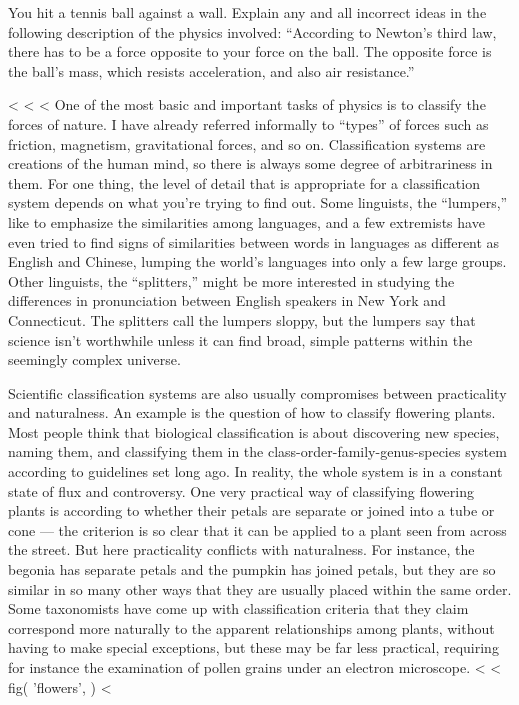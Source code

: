 \begin{dq}
You hit a tennis ball against a wall. Explain any and all
incorrect ideas in the following description of the physics
involved: ``According to Newton's third law, there has to be
a force opposite to your force on the ball. The opposite
force is the ball's mass, which resists acceleration, and
also air resistance.''
\end{dq}

<%
<%
<%
One of the most basic and important tasks of physics is to
classify the forces of nature. I have already referred
informally to ``types'' of forces such as friction,
magnetism, gravitational forces, and so on. Classification
systems are creations of the human mind, so there is always
some degree of arbitrariness in them. For one thing, the
level of detail that is appropriate for a classification
system depends on what you're trying to find out. Some
linguists, the ``lumpers,'' like to emphasize the similarities
among languages, and a few extremists have even tried to
find signs of similarities between words in languages as
different as English and Chinese, lumping the world's
languages into only a few large groups. Other linguists, the
``splitters,'' might be more interested in studying the
differences in pronunciation between English speakers in New
York and Connecticut. The splitters call the lumpers sloppy,
but the lumpers say that science isn't worthwhile unless it
can find broad, simple patterns within the seemingly complex universe.

Scientific classification systems are also usually
compromises between practicality and naturalness. An example
is the question of how to classify flowering plants. Most
people think that biological classification is about
discovering new species, naming them, and classifying them
in the class-order-family-genus-species system according to
guidelines set long ago. In reality, the whole system is in
a constant state of flux and controversy. One very practical
way of classifying flowering plants is according to whether
their petals are separate or joined into a tube or cone ---
the criterion is so clear that it can be applied to a plant
seen from across the street. But here practicality conflicts
with naturalness. For instance, the begonia has separate
petals and the pumpkin has joined petals, but they are so
similar in so many other ways that they are usually placed
within the same order. Some taxonomists have come up with
classification criteria that they claim correspond more
naturally to the apparent relationships among plants,
without having to make special exceptions, but these may be
far less practical, requiring for instance the examination
of pollen grains under an electron microscope.
<%
<%
  fig(
    'flowers',
  )
<%

